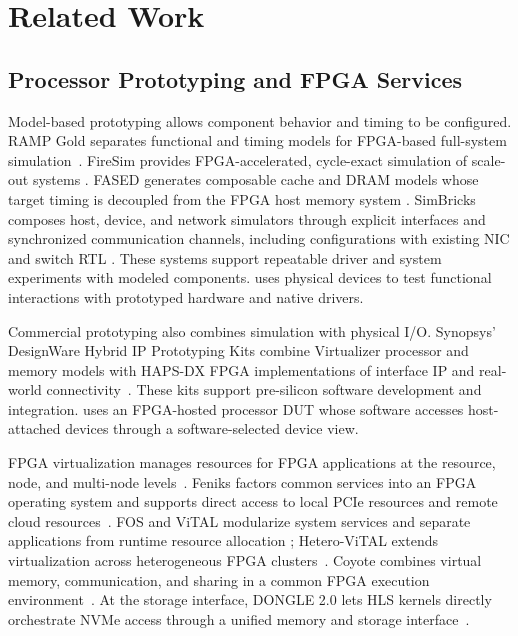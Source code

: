 \section{Related Work}
\label{sec:related}

\subsection{Processor Prototyping and FPGA Services}

Model-based prototyping allows component behavior and timing to be configured.
RAMP Gold separates functional and timing models for FPGA-based full-system
simulation~\cite{tan2010rampgold}. FireSim
provides FPGA-accelerated, cycle-exact simulation of scale-out systems
\cite{karandikar2018firesim}. FASED generates composable cache and DRAM models
whose target timing is decoupled from the FPGA host memory system
\cite{biancolin2019fased}. SimBricks composes host, device, and network
simulators through explicit interfaces and synchronized communication channels,
including configurations with existing NIC and switch RTL
\cite{li2022simbricks}. These systems support repeatable driver and system
experiments with modeled components. \sys uses physical devices to test
functional interactions with prototyped hardware and native drivers.

Commercial prototyping also combines simulation with physical I/O.
Synopsys' DesignWare Hybrid IP Prototyping Kits combine Virtualizer processor
and memory models with HAPS-DX FPGA implementations of interface IP and
real-world connectivity~\cite{synopsys2015hybrid}. These kits support
pre-silicon software development and integration. \sys uses an FPGA-hosted
processor DUT whose software accesses host-attached devices through a
software-selected device view.

FPGA virtualization manages resources for FPGA applications at the resource,
node, and multi-node levels~\cite{vaishnav2018survey}. Feniks factors common services
into an FPGA operating system and supports direct access to local PCIe
resources and remote cloud resources~\cite{zhang2017feniks}. FOS and ViTAL
modularize system services and
separate applications from runtime resource allocation
\cite{vaishnav2020fos,zha2020virtualizing}; Hetero-ViTAL extends virtualization
across heterogeneous FPGA clusters~\cite{zha2021heterovital}. Coyote combines
virtual memory, communication, and sharing in a common FPGA execution
environment~\cite{korolija2020coyote}. At the storage interface, DONGLE 2.0
lets HLS kernels directly orchestrate NVMe access through a unified memory
and storage interface~\cite{wong2024dongle}.


